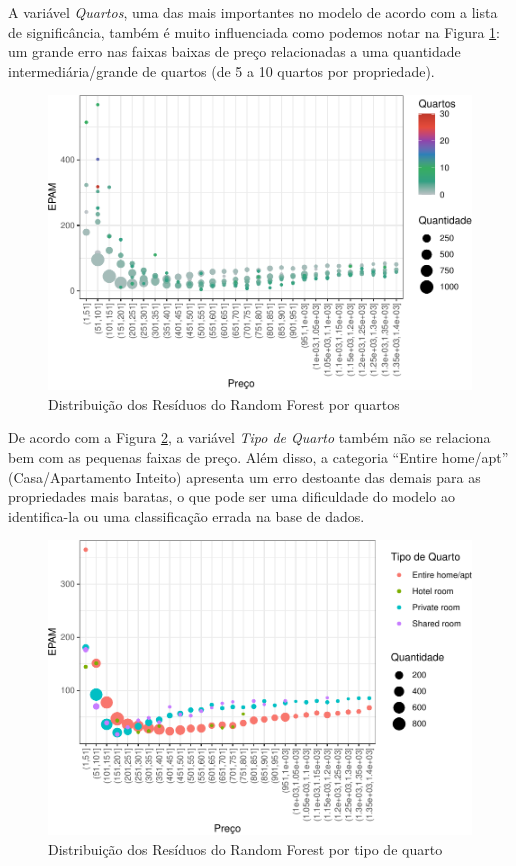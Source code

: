 \documentclass[
	12pt,				%
	a4paper,		%
	oneside,    %
	chapter=TITLE,		   %
	section=TITLE,		   %
	subsection=TITLE,	   %
	subsubsection=TITLE, %
	english,			%
	french,				%
	spanish,			%
	brazil,				%
]{abntex2}
\begin{document}
A variável \emph{Quartos}, uma das mais importantes no modelo de acordo
com a lista de significância, também é muito influenciada como podemos
notar na Figura \ref{graf_resid_rf_quartos}: um grande erro nas faixas
baixas de preço relacionadas a uma quantidade intermediária/grande de
quartos (de 5 a 10 quartos por propriedade).

\begin{figure}
\centering
\includegraphics{00-TCC_files/figure-latex/unnamed-chunk-42-1.pdf}
\caption{\label{graf_resid_rf_quartos}Distribuição dos Resíduos do
Random Forest por quartos}
\end{figure}

De acordo com a Figura \ref{graf_resid_rf_tp_quarto}, a variável
\emph{Tipo de Quarto} também não se relaciona bem com as pequenas faixas
de preço. Além disso, a categoria ``Entire home/apt'' (Casa/Apartamento
Inteito) apresenta um erro destoante das demais para as propriedades
mais baratas, o que pode ser uma dificuldade do modelo ao identifica-la
ou uma classificação errada na base de dados.

\begin{figure}
\centering
\includegraphics{00-TCC_files/figure-latex/graf_resid_rf_tp_quarto-1.pdf}
\caption{\label{graf_resid_rf_tp_quarto}Distribuição dos Resíduos do
Random Forest por tipo de quarto}
\end{figure}
\end{document}
